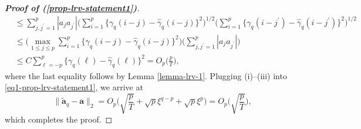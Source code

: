 \begin{proof}[\textnormal{\textbf{Proof of (\ref{prop-lrv-statement1})}}]
\begin{align*}
 & \le \sum_{j,j^\prime=1}^p |a_j a_{j^\prime}| \Big( \sum_{i=1}^p \big\{ \gamma_q(i-j) - \widehat{\gamma}_q(i-j) \big \}^2 \Big)^{1/2}  \Big( \sum_{i=1}^p \big\{ \gamma_q(i-j^\prime) - \widehat{\gamma}_q(i-j^\prime) \big \}^2 \Big)^{1/2} \\
 & \le \Big( \max_{1 \le j \le p} \sum_{i=1}^p \big\{ \gamma_q(i-j) - \widehat{\gamma}_q(i-j) \big \}^2 \Big) \Big( \sum_{j,j^\prime=1}^p |a_j a_{j^\prime}| \Big) \\
 & \le C \sum_{\ell=-p}^p \big\{ \gamma_q(\ell) - \widehat{\gamma}_q(\ell) \big \}^2 = O_p\Big(\frac{p}{T}\Big),
\end{align*}
where the last equality follows by Lemma \ref{lemma-lrv-1}. Plugging (i)--(iii) into \eqref{eq1-prop-lrv-statement1}, we arrive at 
\[ \| \widetilde{\boldsymbol{a}}_q - \boldsymbol{a} \|_2 = O_p \Big( \sqrt{\frac{p}{T}} + \sqrt{p} \xi^{q-p} + \sqrt{p} \xi^p \Big) = O_p\Big(\sqrt{\frac{p}{T}}\Big), \]
which completes the proof.
\end{proof}


